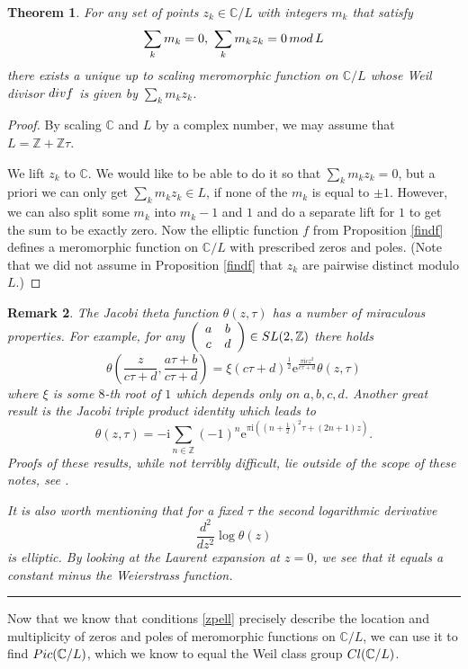 \documentclass[11pt]{article}
\numberwithin{equation}{section}
\numberwithin{footnote}{section}
\newtheorem{thm}{Theorem}[section]
\newtheorem{rem}[thm]{Remark}
\newcommand{\blue}{\color{blue}}
\newcommand{\ee}{{\mathrm e}}
\newcommand{\ii}{{\mathrm i}}
\newcommand{\Z}{{\mathbb Z}}
\newcommand{\C}{{\mathbb C}}
\begin{document}
\begin{thm}\label{mainzpell}
For any set of points  $z_k\in \C/L$ with integers $m_k$ that satisfy 
$$
\sum_k m_k = 0,~\sum_k m_k z_k = 0\,{\rm mod}\,L
$$
there exists a unique up to scaling meromorphic function on $\C/L$ whose Weil divisor ${\rm div} f$ is given by $\sum_k m_k z_k$.
\end{thm}

\begin{proof}
By scaling $\C$ and $L$ by a complex number, we may assume that $L=\Z+\Z\tau$.

We lift $z_k$ to $\C$. We would like to be able to do it so that $\sum_k m_k z_k = 0$, but a priori we can only get 
$\sum_k m_k z_k \in L$, if none of the $m_k$ is equal to $\pm 1$. However, we can also split some $m_k$ into $m_k-1$ and $1$ and do a separate lift for $1$ to get the sum to be exactly zero. Now the elliptic function $f$ from Proposition \ref{findf} defines a meromorphic function on $\C/L$ with prescribed zeros and poles. (Note that we did not assume in Proposition \ref{findf} that $z_k$ are pairwise distinct modulo $L$.)
\end{proof}

\begin{rem}
The Jacobi theta function $\theta(z,\tau)$ has a number of miraculous properties. For example, for any $\left(\begin{array}{cc}a&b\\
c&d\end{array}\right) \in {\rm SL}(2,\Z)$ there holds
$$
\theta \left(\frac z{c\tau+d},\frac {a\tau+b}{c\tau+d}\right) = \xi (c\tau+d)^{\frac 12} \ee^{\frac {\pi \ii c z^2}{c\tau+d}}\theta (z,\tau)
$$
where $\xi$ is some $8$-th root of $1$ which depends only on $a,b,c,d$.
Another great result is the Jacobi triple product identity which leads to
$$
\theta(z,\tau) = -\ii \sum_{n\in\Z} (-1)^{n} \ee^{\pi\ii((n+\frac 12)^2 \tau + (2n+1)z)}.
$$
Proofs of these results, while not terribly difficult, lie outside of the scope of these notes, see \cite{Chandrasekharan}.

It is also worth mentioning that for a fixed $\tau$ the second logarithmic derivative 
$$
\frac {d^2}{dz^2} \log \theta(z)
$$
is elliptic. By looking at the Laurent expansion at $z=0$, we see that it equals a constant minus the Weierstrass function.
\end{rem}

\smallskip
{\blue \hrule}
Now that we know that conditions \eqref{zpell} precisely describe the location and multiplicity of zeros and poles of meromorphic functions on $\C/L$, we can use it to find ${\rm Pic}(\C/L)$, which we know to equal the Weil class group ${\rm Cl}(\C/L)$.
\end{document}
